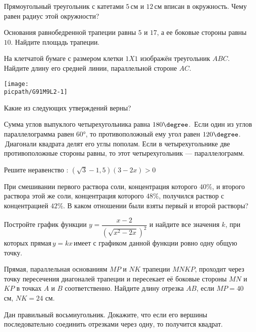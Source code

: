 \begin{class}[number=2]
\begin{listofex}
		\item Прямоугольный треугольник с катетами \( 5 \) см и \( 12 \) см вписан в окружность. Чему равен радиус этой окружности?
		\item Основания равнобедренной трапеции равны \( 5 \) и \( 17 \), а ее боковые стороны равны \( 10 \). Найдите площадь трапеции.
		\item
		\begin{minipage}[t]{\bodywidth}
		На клетчатой бумаге с размером клетки \( 1X1 \) изображён треугольник \( ABC \). Найдите длину его средней линии, параллельной стороне \( AC \).
			\foranswer
		\end{minipage}
		\gapwidth
		\begin{minipage}[t]{\picwidth}
			\texttt{[image: \\picpath/G91M9L2-1]}
		\end{minipage}
		\item Какие из следующих утверждений верны?
		\begin{tasks}
			\task Сумма углов выпуклого четырехугольника равна \( 180\degree \).
			\task Если один из углов параллелограмма равен 60°, то противоположный ему угол равен \( 120\degree \).
			\task Диагонали квадрата делят его углы пополам.
			\task Если в четырехугольнике две противоположные стороны равны, то этот четырехугольник --- параллелограмм.
		\end{tasks}
		\item Решите неравенство : \((\sqrt{3}-1,5)(3-2x)>0\)
		\item При смешивании первого раствора соли, концентрация которого \( 40\% \), и второго раствора этой же соли, концентрация которого \( 48\% \), получился раствор с концентрацией \( 42\% \). В каком отношении были взяты первый и второй растворы?
		\item Постройте график функции \(y=\dfrac{x-2}{(\sqrt{x^2-2x})^2}\) и найдите все значения \( k \), при которых прямая \( y=kx \) имеет с графиком данной функции ровно одну общую точку.
		\item Прямая, параллельная основаниям \( MP \) и \( NK \) трапеции \( MNKP \), проходит через точку пересечения диагоналей трапеции и пересекает её боковые стороны \( MN \) и \( KP \) в точках  \( A \) и \( B \) соответственно. Найдите длину отрезка \( AB \), если \( MP=40 \) см, \( NK=24 \) см.
		\item Дан правильный восьмиугольник. Докажите, что если его вершины последовательно соединить отрезками через одну, то получится квадрат.
	\end{listofex}
\end{class}

